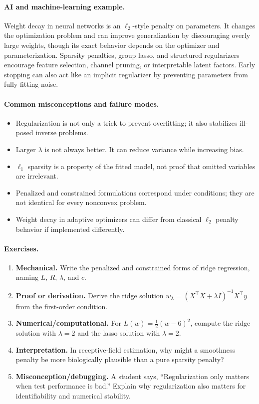 \paragraph{AI and machine-learning example.}
Weight decay in neural networks is an \(\ell_2\)-style penalty on parameters. It changes the optimization problem and can improve generalization by discouraging overly large weights, though its exact behavior depends on the optimizer and parameterization. Sparsity penalties, group lasso, and structured regularizers encourage feature selection, channel pruning, or interpretable latent factors. Early stopping can also act like an implicit regularizer by preventing parameters from fully fitting noise.

\paragraph{Common misconceptions and failure modes.}
\begin{itemize}[leftmargin=*]
\item Regularization is not only a trick to prevent overfitting; it also stabilizes ill-posed inverse problems.
\item Larger \(\lambda\) is not always better. It can reduce variance while increasing bias.
\item \(\ell_1\) sparsity is a property of the fitted model, not proof that omitted variables are irrelevant.
\item Penalized and constrained formulations correspond under conditions; they are not identical for every nonconvex problem.
\item Weight decay in adaptive optimizers can differ from classical \(\ell_2\) penalty behavior if implemented differently.
\end{itemize}

\paragraph{Exercises.}
\begin{enumerate}[label=\textbf{20.4.\arabic*.}, leftmargin=*]
\item \textbf{Mechanical.} Write the penalized and constrained forms of ridge regression, naming \(L\), \(R\), \(\lambda\), and \(c\).
\item \textbf{Proof or derivation.} Derive the ridge solution \(w_\lambda=(X^\top X+\lambda I)^{-1}X^\top y\) from the first-order condition.
\item \textbf{Numerical/computational.} For \(L(w)=\frac12(w-6)^2\), compute the ridge solution with \(\lambda=2\) and the lasso solution with \(\lambda=2\).
\item \textbf{Interpretation.} In receptive-field estimation, why might a smoothness penalty be more biologically plausible than a pure sparsity penalty?
\item \textbf{Misconception/debugging.} A student says, ``Regularization only matters when test performance is bad.'' Explain why regularization also matters for identifiability and numerical stability.
\end{enumerate}

